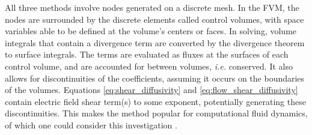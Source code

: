 All three methods involve nodes generated on a discrete mesh.
In the FVM, the nodes are surrounded by the discrete elements called control volumes, with space variables able to be defined at the volume's centers or faces.
In solving, volume integrals that contain a divergence term are converted by the divergence theorem to surface integrals.
The terms are evaluated as fluxes at the surfaces of each control volume, and are accounted for between volumes, \emph{i.e.} conserved.
It also allows for discontinuities of the coefficients, assuming it occurs on the boundaries of the volumes.
Equations \ref{eq:shear_diffusivity} and \ref{eq:flow_shear_diffusivity} contain electric field shear term(s) to some exponent, potentially generating these discontinuities.
This makes the method popular for computational fluid dynamics, of which one could consider this investigation \cite{eymard_finite_2003}.


